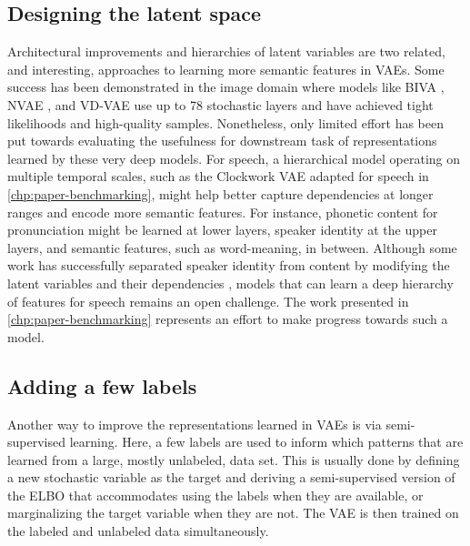 



\subsection{Designing the latent space} 
Architectural improvements and hierarchies of latent variables are two related, and interesting, approaches to learning more semantic features in VAEs. 
Some success has been demonstrated in the image domain where models like BIVA \parencite{maaloe_biva_2019}, NVAE \parencite{vahdat_nvae_2020}, and VD-VAE \parencite{child_very_2021} use up to 78 stochastic layers and have achieved tight likelihoods and high-quality samples. 
Nonetheless, only limited effort has been put towards evaluating the usefulness for downstream task of representations learned by these very deep models. 
For speech, a hierarchical model operating on multiple temporal scales, such as the Clockwork VAE \parencite{saxena_clockwork_2021} adapted for speech in \cref{chp:paper-benchmarking}, might help better capture dependencies at longer ranges and encode more semantic features. 
For instance, phonetic content for pronunciation might be learned at lower layers, speaker identity at the upper layers, and semantic features, such as word-meaning, in between. 
Although some work has successfully separated speaker identity from content by modifying the latent variables and their dependencies \parencite{hsu_unsupervised_2017}, models that can learn a deep hierarchy of features for speech remains an open challenge. The work presented in \cref{chp:paper-benchmarking} represents an effort to make progress towards such a model. 


\subsection{Adding a few labels} 
Another way to improve the representations learned in VAEs is via semi-supervised learning. 
Here, a few labels are used to inform which patterns that are learned from a large, mostly unlabeled, data set. 
This is usually done by defining a new stochastic variable as the target and deriving a semi-supervised version of the ELBO that accommodates using the labels when they are available, or marginalizing the target variable when they are not. The VAE is then trained on the labeled and unlabeled data simultaneously. 

